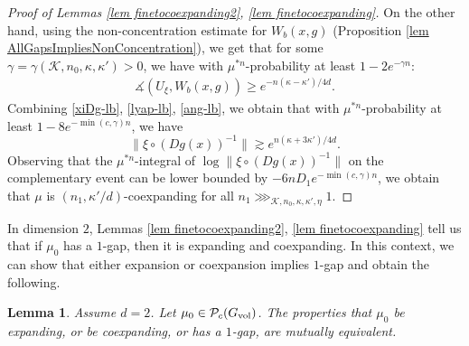 \documentclass[11pt, leqno, fleqn]{amsart}
\newcommand{\margem}[1]{\marginpar{{\scriptsize {#1}}}}
\def\clo{   \color{orange}}
\newcommand{\cP}{{\mathcal P}}
\newcommand{\cK}{{\mathcal K}}
\newcommand{\ary}{\begin{eqnarray}}
\newcommand{\eary}{\end{eqnarray}}
\newtheorem{lemma}[thm]{\bf Lemma}
\theoremstyle{definition}
\theoremstyle{definition}
\def \vol{  {\rm vol} }
\begin{document}
\begin{proof}[Proof of Lemmas \ref{lem finetocoexpanding2}, \ref{lem finetocoexpanding}]
On the other hand, using the non-concentration estimate for $W_{b}(x,g)$ (Proposition \ref{lem AllGapsImpliesNonConcentration}), we get that for some $\gamma=\gamma(\cK, n_{0}, \kappa, \kappa')>0$, we have with $\mu^{*n}$-probability at least $1-2e^{-\gamma n}$:
\ary\label{ang-lb}
 \measuredangle (U_{\xi}, W_{b}(x,g))\geq e^{-n (\kappa-\kappa')/4d}.
 \eary
Combining \eqref{xiDg-lb}, \eqref{lyap-lb}, \eqref{ang-lb}, we obtain that with $\mu^{*n}$-probability at least $1-8e^{-\min(c,\gamma) n}$, we have 
$$\|\xi \circ (Dg(x))^{-1} \| \gtrsim e^{n  (\kappa+3\kappa')/4d}.$$
Observing that the $\mu^{*n}$-integral of $\log \|\xi \circ (Dg(x))^{-1} \| $ on the complementary event can be lower bounded by $-6nD_{1}e^{-\min(c,\gamma) n}$, we obtain that $\mu$ is $(n_{1}, \kappa'/d)$-coexpanding for all $n_{1}\ggg_{\cK, n_{0}, \kappa, \kappa', \eta} 1$.
 \end{proof}
  
  
  
  
  
  
		 In dimension $2$,  Lemmas \ref{lem finetocoexpanding2}, \ref{lem finetocoexpanding} tell us that if $\mu_{0}$ has a $1$-gap, then it is expanding and coexpanding. In this context, we can show that either expansion or coexpansion implies $1$-gap and obtain the following.
		 		  
		 \begin{lemma} \label{lem contractinggaptocoexpanding0} 
		 	 Assume  $d = 2$. Let $\mu_{0} \in \cP_c(G_{\vol})$. The properties that $\mu_{0}$ be  expanding, or  be coexpanding, or has a $1$-gap, are mutually equivalent.
		 \end{lemma}
		 
\end{document}
